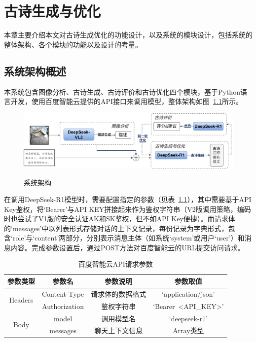 
\chapter{古诗生成与优化}

本章主要介绍本文对古诗生成优化的功能设计，以及系统的模块设计，包括系统的整体架构、各个模块的功能以及设计的考量。

\section{系统架构概述}
本系统包含图像分析、古诗生成、古诗评价和古诗优化四个模块，基于Python语言开发，使用百度智能云提供的API接口来调用模型，整体架构如图~\ref{fig:system_architecture}所示。


\begin{figure}[h]
    \centering
    \includegraphics[width=1\textwidth]
    {figures/系统架构.jpg}\\
    \caption{系统架构}
    \label{fig:system_architecture}
\end{figure}

在调用DeepSeek-R1模型时，需要配置指定的参数（见表~\ref{tab:post_params}），其中需要基于API Key鉴权，将`Bearer'与API KEY拼接起来作为鉴权字符串（V2版调用策略，编码时也尝试了V1版的安全认证AK和SK鉴权，但不如API Key便捷）。而请求体的`messages'中以列表形式存储对话的上下文记录，每份记录为字典形式，包含`role'与`content'两部分，分别表示消息主体（如系统`system'或用户`user'）和消息内容。完成参数设置后，通过POST方法对百度智能云的URL提交访问请求。

\begin{table}[ht]
  \centering
  \caption{百度智能云API请求参数}
  \label{tab:post_params}
  \begin{tabular}{cccc}
      \toprule
      参数类型 & 参数名 & 参数说明 & 参数取值\\
      \midrule
      \multirow{2}{*}{Headers} & Content-Type & 请求体的数据格式 & `application/json'\\
      & Authorization & 鉴权字符串 & `Bearer\ <API\_KEY>'\\
      \cmidrule{2-4}
      \multirow{2}{*}{Body} & model & 调用模型名 & `deepseek-r1'\\
      & messages & 聊天上下文信息 & Array类型\\
      \bottomrule
  \end{tabular}
\end{table}


